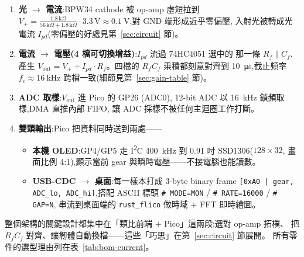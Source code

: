 \documentclass[12pt,a4paper]{article}
\begin{document}
\begin{enumerate}[leftmargin=2em,itemsep=2pt]
	\item \textbf{光 \(\to\) 電流}:BPW34 cathode 被 op-amp 虛短拉到
	      \(V_{+} = \frac{1.8\,\text{k}\Omega}{56\,\text{k}\Omega + 1.8\,\text{k}\Omega}
	      \cdot 3.3\,\text{V} \approx \SI{0.1}{\volt}\),對 GND 端形成近乎零偏壓,
	      入射光被轉成光電流 \(I_{pd}\)(零偏壓的好處見第~\ref{sec:circuit} 節)。
	\item \textbf{電流 \(\to\) 電壓(4 檔可切換增益)}:\(I_{pd}\) 流過 74HC4051 選中的
	      那一條 \(R_f \parallel C_f\),產生
	      \(V_\text{out} = V_+ + I_{pd}\cdot R_f\)。四檔的 \(R_fC_f\) 乘積都刻意對齊到
	      \SI{10}{\micro\second},截止頻率 \(f_c \approx \SI{16}{\kilo\hertz}\)
	      跨檔一致(細節見第~\ref{sec:gain-table} 節)。
	\item \textbf{ADC 取樣}:\(V_\text{out}\) 進 Pico 的 GP26 (ADC0),
	      12-bit ADC 以 \SI{16}{\kilo\hertz} 鎖頻取樣,DMA 直推內部 FIFO,
	      讓 ADC 採樣不被任何主迴圈工作打斷。
	\item \textbf{雙頭輸出}:Pico 把資料同時送到兩處——
	      \begin{itemize}[leftmargin=1.5em,itemsep=0pt]
		      \item \textbf{本機 OLED}:GP4/GP5 走 I\textsuperscript{2}C
		            \SI{400}{\kilo\hertz} 到 0.91 吋 SSD1306(\(128 \times 32\),
		            畫面比例 4:1),顯示當前 gear 與瞬時電壓——不接電腦也能讀數。
		      \item \textbf{USB-CDC \(\to\) 桌面}:每一樣本打成 3-byte binary frame
		            \texttt{[0xA0\,|\,gear, ADC\_lo, ADC\_hi]},搭配 ASCII 標頭
		            \texttt{\# MODE=MON} / \texttt{\# RATE=16000} / \texttt{\# GAP=N},
		            串流到桌面端的 \texttt{rust\_flico} 做時域 \(+\) FFT 即時繪圖。
	      \end{itemize}
\end{enumerate}

整個架構的關鍵設計都集中在「類比前端 \(+\) Pico」這兩段:選對 op-amp 拓樸、
把 \(R_fC_f\) 對齊、讓韌體自動換檔——這些「巧思」在第~\ref{sec:circuit} 節展開。
所有零件的選型理由列在表~\ref{tab:bom-current}。
\end{document}
